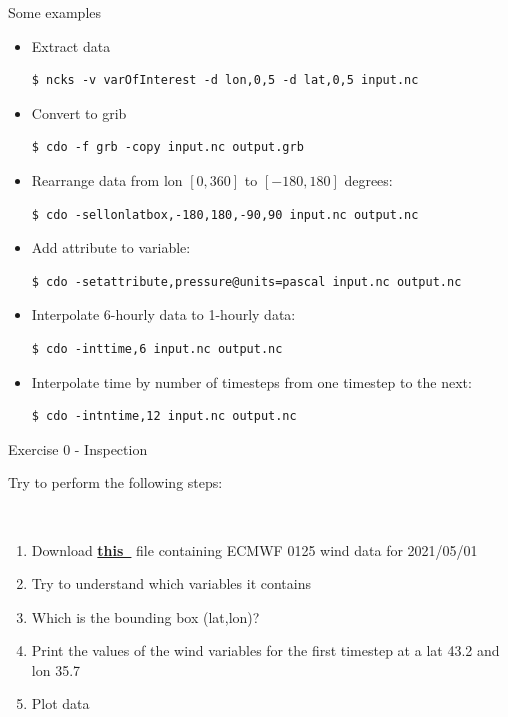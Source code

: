 \documentclass[9pt]{beamer}
\begin{document}
\begin{frame}[fragile]{Some examples}
    \begin{itemize}
        \item Extract data
        \begin{verbatim}
$ ncks -v varOfInterest -d lon,0,5 -d lat,0,5 input.nc
\end{verbatim}
        
        \item Convert to grib
\begin{verbatim}
$ cdo -f grb -copy input.nc output.grb
\end{verbatim}

\item Rearrange data from lon $[0, 360]$  to $[-180, 180]$ degrees:

\begin{verbatim}
$ cdo -sellonlatbox,-180,180,-90,90 input.nc output.nc    
\end{verbatim}

\item Add attribute to variable:
\begin{verbatim}
$ cdo -setattribute,pressure@units=pascal input.nc output.nc
\end{verbatim}

\item Interpolate 6-hourly data to 1-hourly data:
\begin{verbatim}
$ cdo -inttime,6 input.nc output.nc
\end{verbatim}

\item Interpolate time by number of timesteps from one timestep to the next:

\begin{verbatim}
$ cdo -intntime,12 input.nc output.nc
\end{verbatim}



    \end{itemize}
\end{frame}



\begin{frame}[fragile]{Exercise 0 - Inspection}

Try to perform the following steps:

\ 

    \begin{enumerate}
        \item Download \textbf{\href{https://www.dropbox.com/s/hvc5oftq3wbgo2k/20210501.nc?dl=0}{this\ \faExternalLink}} file containing ECMWF 0125 wind data for 2021/05/01
        \item Try to understand which variables it contains
        \item Which is the bounding box (lat,lon)?
        \item Print the values of the wind variables for the first timestep at a lat 43.2 and lon 35.7
        \item Plot data
    \end{enumerate}
\end{frame}
\end{document}

